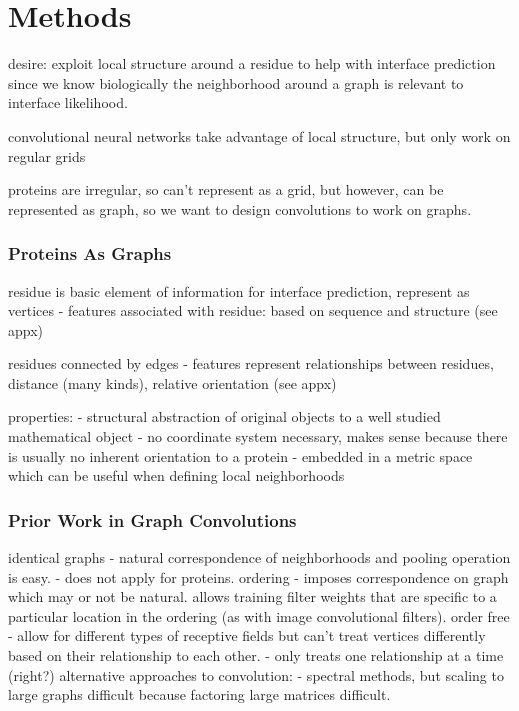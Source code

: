 \chapter{Methods}
\label{chap:methods}

desire: exploit local structure around a residue to help with interface prediction since we know biologically the neighborhood around a graph is relevant to interface likelihood.

convolutional neural networks take advantage of local structure, but only work on regular grids

proteins are irregular, so can't represent as a grid, but however, can be represented as graph, so we want to design convolutions to work on graphs. 

\subsection{Proteins As Graphs}

residue is basic element of information for interface prediction, represent as vertices
- features associated with residue: based on sequence and structure (see appx)

residues connected by edges
- features represent relationships between residues, distance (many kinds), relative orientation (see appx)

properties:
- structural abstraction of original objects to a well studied mathematical object
- no coordinate system necessary, makes sense because there is usually no inherent orientation to a protein
- embedded in a metric space which can be useful when defining local neighborhoods

\subsection{Prior Work in Graph Convolutions}
identical graphs
	- natural correspondence of neighborhoods and pooling operation is easy.
	- does not apply for proteins.
ordering 
	- imposes correspondence on graph which may or not be natural. allows training filter weights that are specific to a particular location in the ordering (as with image convolutional filters).
order free
	- allow for different types of receptive fields but can't treat vertices differently based on their relationship to each other.
	- only treats one relationship at a time (right?)
alternative approaches to convolution:
	- spectral methods, but scaling to large graphs difficult because factoring large matrices difficult.

